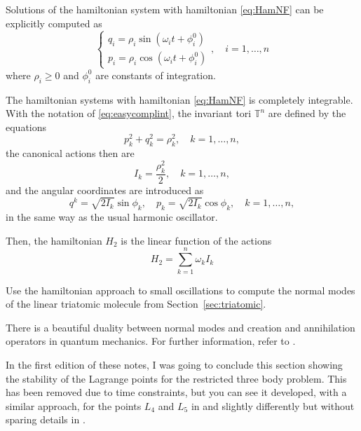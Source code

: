 \documentclass[english,fontsize=11pt,paper=a5,oneside]{scrbook}
\theoremstyle{definition}
\newenvironment{remark}
  {\pushQED{\qed}\renewcommand{\qedsymbol}{$\lozenge$}\remarkx}
  {\popQED\endremarkx}
\newenvironment{exercise}
  {\pushQED{\qed}\renewcommand{\qedsymbol}{$\maltese$}\exercisex}
  {\popQED\endexercisex}
\begin{document}
Solutions of the hamiltonian system with hamiltonian \eqref{eq:HamNF} can be explicitly computed as
\begin{equation}\label{eq:easycomplint}
  \left\lbrace
  \begin{aligned}
    q_i = \rho_i \sin(\omega_it +\phi_i^0) \\
    p_i = \rho_i \cos(\omega_it +\phi_i^0)
  \end{aligned}
  \right .,\quad i=1,\ldots,n
\end{equation}
where $\rho_i\geq0$ and $\phi_i^0$ are constants of integration.

\begin{remark}
  The hamiltonian systems with hamiltonian \eqref{eq:HamNF} is completely integrable.
  With the notation of \eqref{eq:easycomplint}, the invariant tori $\mathbb{T}^n$ are defined by the equations
  \begin{equation}
    p_k^2 + q_k^2 = \rho_k^2, \quad k=1,\ldots,n,
  \end{equation}
  the canonical actions then are
  \begin{equation}
    I_k = \frac{\rho_k^2}2, \quad k=1,\ldots,n,
  \end{equation}
  and the angular coordinates are introduced as
  \begin{equation}
    q^k = \sqrt{2I_k} \sin \phi_k, \quad p_k = \sqrt{2I_k} \cos \phi_k, \quad k=1,\ldots,n,
  \end{equation}
  in the same way as the usual harmonic oscillator.

  Then, the hamiltonian $H_2$ is the linear function of the actions
  \begin{equation}
    H_2 = \sum_{k=1}^n \omega_k I_k
  \end{equation}
\end{remark}

\begin{exercise}[The linear triatomic molecule]
  Use the hamiltonian approach to small oscillations to compute the normal modes of the linear triatomic molecule from Section~\ref{sec:triatomic}.
\end{exercise}

There is a beautiful duality between normal modes and creation and annihilation operators in quantum mechanics. For further information, refer to \cite[Chapter 2.10]{book:lowenstein}.

In the first edition of these notes, I was going to conclude this section showing the stability of the Lagrange points for the restricted three body problem.
This has been removed due to time constraints, but you can see it developed, with a similar approach, for the points $L_4$ and $L_5$ in \cite[Chapter 2.10]{book:lowenstein} and slightly differently but without sparing details in \cite{book:arnoldcelestial,book:celletti}.
\end{document}
